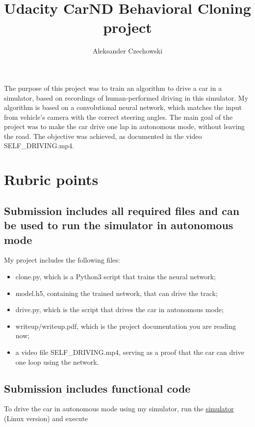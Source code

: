 \documentclass[a4paper,10pt]{article}
\begin{document}
\pagestyle{empty}
\noindent

\title{Udacity CarND Behavioral Cloning project}
\author{Aleksander Czechowski}
\maketitle

The purpose of this project was to train an algorithm to drive a car in a simulator,
based on recordings of human-performed driving in this simulator.
My algorithm is based on a convolutional neural network,
which matches the input from vehicle's camera with the correct steering angles.
The main goal of the project was to make the car drive one lap in autonomous mode, without leaving the road.
The objective was achieved, as documented in the video SELF\_DRIVING.mp4.

\section{Rubric points}

\subsection{Submission includes all required files and can be used to run the simulator in autonomous mode}

My project includes the following files:

\begin{itemize}
  \item clone.py, which is a Python3 script that trains the neural network;
  \item model.h5, containing the trained network, that can drive the track;
  \item drive.py, which is the script that drives the car in autonomous mode;
  \item writeup/writeup.pdf, which is the project documentation you are reading now;
  \item a video file SELF\_DRIVING.mp4, serving as a proof that the car can drive one loop using the network.
\end{itemize}
 

\subsection{Submission includes functional code}

To drive the car in autonomous mode using my simulator,
run the \href{https://d17h27t6h515a5.cloudfront.net/topher/2017/February/58ae46bb_linux-sim/linux-sim.zip}{simulator} (Linux version)
and execute
\end{document}
